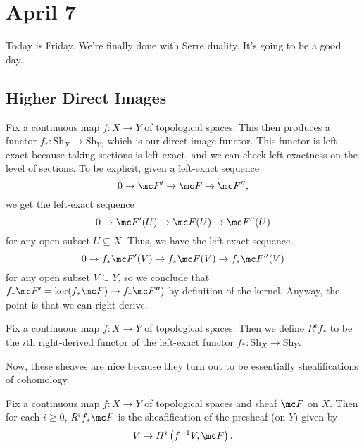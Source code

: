 \documentclass[../notes.tex]{subfiles}
\begin{document}
\section{April 7}

Today is Friday. We're finally done with Serre duality. It's going to be a good day.

\subsection{Higher Direct Images}
Fix a continuous map $f\colon X\to Y$ of topological spaces. This then produces a functor $f_*\colon\mathrm{Sh}_X\to\mathrm{Sh}_Y$, which is our direct-image functor. This functor is left-exact because taking sections is left-exact, and we can check left-exactness on the level of sections. To be explicit, given a left-exact sequence
\[0\to\mc F'\to\mc F\to\mc F'',\]
we get the left-exact sequence
\[0\to\mc F'(U)\to\mc F(U)\to\mc F''(U)\]
for any open subset $U\subseteq X$. Thus, we have the left-exact sequence
\[0\to f_*\mc F'(V)\to f_*\mc F(V)\to f_*\mc F''(V)\]
for any open subset $V\subseteq Y$, so we conclude that $f_*\mc F'=\ker(f_*\mc F)\to f_*\mc F'')$ by definition of the kernel. Anyway, the point is that we can right-derive.
\begin{definition}
	Fix a continuous map $f\colon X\to Y$ of topological spaces. Then we define $R^if_*$ to be the $i$th right-derived functor of the left-exact functor $f_*\colon\mathrm{Sh}_X\to\mathrm{Sh}_Y$.
\end{definition}
Now, these sheaves are nice because they turn out to be essentially sheafifications of cohomology.
\begin{proposition} \label{prop:higher-direct-image-by-cohom}
	Fix a continuous map $f\colon X\to Y$ of topological spaces and sheaf $\mc F$ on $X$. Then for each $i\ge0$, $R^if_*\mc F$ is the sheafification of the presheaf (on $Y$) given by
	\[V\mapsto H^i\left(f^{-1}V,\mc F\right).\]
\end{proposition}
\end{document}
